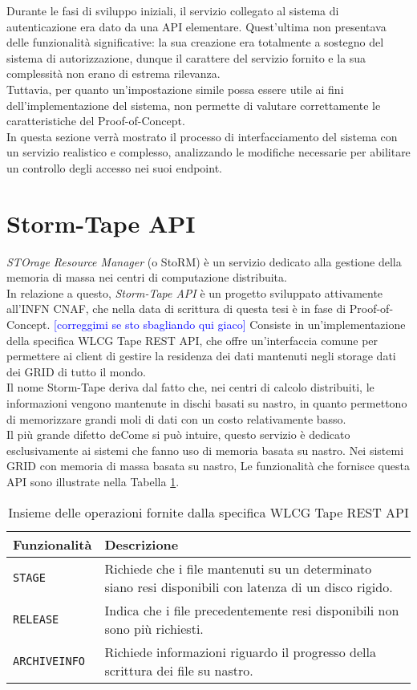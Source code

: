 Durante le fasi di sviluppo iniziali, il servizio collegato al sistema di autenticazione era dato da una API
elementare. Quest'ultima non presentava delle funzionalità significative: la sua creazione era totalmente 
a sostegno del sistema di autorizzazione, dunque il carattere del servizio fornito e la sua complessità non erano 
di estrema rilevanza.  
\\ Tuttavia, per quanto un'impostazione simile possa essere utile ai fini dell'implementazione del sistema, non 
permette di valutare correttamente le caratteristiche del Proof-of-Concept.
\\ In questa sezione verrà mostrato il processo di interfacciamento del sistema con un servizio 
realistico e complesso, analizzando le modifiche necessarie per abilitare un controllo degli accesso
nei suoi endpoint. 
\section{Storm-Tape API}
\textit{STOrage Resource Manager} (o StoRM) è un servizio dedicato alla gestione della memoria 
di massa nei centri di computazione distribuita. \\ In relazione a questo, \textit{Storm-Tape API} è un progetto sviluppato
 attivamente all'INFN CNAF, che nella data di scrittura di questa tesi è in fase di Proof-of-Concept.
 \textcolor{blue}{[correggimi se sto sbagliando qui giaco]}
Consiste in un'implementazione della specifica {WLCG Tape REST API}, che offre un'interfaccia comune per permettere 
ai client di gestire la residenza dei dati mantenuti negli storage dati dei GRID di tutto il mondo. 
\\ Il nome Storm-Tape deriva dal fatto che, nei centri di calcolo distribuiti,
 le informazioni vengono mantenute in dischi basati su nastro, in quanto permettono di memorizzare 
grandi moli di dati con un costo relativamente basso. \\
Il più grande difetto deCome si può intuire, questo servizio è dedicato esclusivamente ai sistemi che fanno uso di memoria basata su nastro. 
Nei sistemi GRID con memoria di massa basata su nastro, 
Le funzionalità che fornisce questa API sono illustrate nella Tabella \ref*{tab:table-name}.
\begin{table}
\begin{center}
\begin{tabular}{ | m{8em} | m{19em} | } 
  \hline
  \textbf{Funzionalità} & \textbf{Descrizione} \\ 
  \hline
  \texttt{STAGE} & Richiede che i file mantenuti su un determinato siano resi disponibili con latenza di un disco rigido. \\ 
  \hline
  \texttt{RELEASE} & Indica che i file precedentemente resi disponibili non sono più richiesti.   \\ 
  \hline
  \texttt{ARCHIVEINFO} & Richiede informazioni riguardo il progresso della scrittura dei file su nastro. \\ 
  \hline
\end{tabular}
\caption{\label{tab:table-name} Insieme delle operazioni fornite dalla specifica WLCG Tape REST API}
\end{center}
\end{table}
